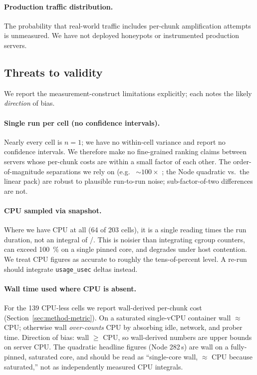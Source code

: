 \paragraph{Production traffic distribution.}
The probability that real-world traffic includes per-chunk
amplification attempts is unmeasured. We have not deployed
honeypots or instrumented production servers.

\subsection{Threats to validity}
\label{sec:threats}

We report the measurement-construct limitations explicitly; each
notes the likely \emph{direction} of bias.

\paragraph{Single run per cell (no confidence intervals).}
Nearly every cell is $n{=}1$; we have no within-cell variance and
report no confidence intervals. We therefore make no fine-grained
ranking claims between servers whose per-chunk costs are within a
small factor of each other. The order-of-magnitude separations we
rely on (e.g.\  $\sim\!100\times$ ; the
Node quadratic vs.\ the linear pack) are robust to plausible
run-to-run noise; sub-factor-of-two differences are not.

\paragraph{CPU sampled via  snapshot.}
Where we have CPU at all (64 of 203 cells), it is a single
 reading times the run duration,
not an integral of /. This is
noisier than integrating cgroup counters, can exceed
\SI{100}{\percent} on a single pinned core, and degrades under
host contention. We treat CPU figures as accurate to roughly the
tens-of-percent level. A re-run should integrate 
\texttt{usage\_usec} deltas instead.

\paragraph{Wall time used where CPU is absent.}
For the 139 CPU-less cells we report wall-derived per-chunk cost
(Section~\ref{sec:method-metric}). On a saturated single-vCPU
container wall $\approx$ CPU; otherwise wall \emph{over-counts}
CPU by absorbing idle, network, and prober time. Direction of
bias: wall $\geq$ CPU, so wall-derived numbers are upper bounds on
server CPU. The quadratic headline figures (Node 282\,s) are wall
on a fully-pinned, saturated core, and should be read as
``single-core wall, $\approx$ CPU because saturated,'' not as
independently measured CPU integrals.

